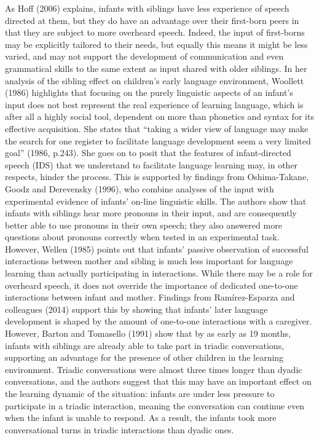 \documentclass[
  english,
  man,floatsintext]{apa6}
\begin{document}
As Hoff (2006) explains, infants with siblings have less experience of speech directed at them, but they do have an advantage over their first-born peers in that they are subject to more overheard speech. Indeed, the input of first-borns may be explicitly tailored to their needs, but equally this means it might be less varied, and may not support the development of communication and even grammatical skills to the same extent as input shared with older siblings. In her analysis of the sibling effect on children's early language environment, Woollett (1986) highlights that focusing on the purely linguistic aspects of an infant's input does not best represent the real experience of learning language, which is after all a highly social tool, dependent on more than phonetics and syntax for its effective acquisition. She states that ``taking a wider view of language may make the search for one register to facilitate language development seem a very limited goal'' (1986, p.243). She goes on to posit that the features of infant-directed speech (IDS) that we understand to facilitate language learning may, in other respects, hinder the process. This is supported by findings from Oshima-Takane, Goodz and Derevensky (1996), who combine analyses of the input with experimental evidence of infants' on-line linguistic skills. The authors show that infants with siblings hear more pronouns in their input, and are consequently better able to use pronouns in their own speech; they also answered more questions about pronouns correctly when tested in an experimental task. However, Wellen (1985) points out that infants' passive observation of successful interactions between mother and sibling is much less important for language learning than actually participating in interactions. While there may be a role for overheard speech, it does not override the importance of dedicated one-to-one interactions between infant and mother. Findings from Ramírez-Esparza and colleagues (2014) support this by showing that infants' later language development is shaped by the amount of one-to-one interactions with a caregiver. However, Barton and Tomasello (1991) show that by as early as 19 months, infants with siblings are already able to take part in triadic conversations, supporting an advantage for the presence of other children in the learning environment. Triadic conversations were almost three times longer than dyadic conversations, and the authors suggest that this may have an important effect on the learning dynamic of the situation: infants are under less pressure to participate in a triadic interaction, meaning the conversation can continue even when the infant is unable to respond. As a result, the infants took more conversational turns in triadic interactions than dyadic ones.
\end{document}
